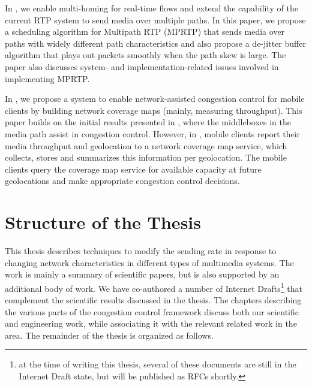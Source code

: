 In , we enable multi-homing for real-time flows and extend the
capability of the current RTP system to send media over multiple paths. In
this paper, we propose a scheduling algorithm for Multipath RTP (MPRTP) that
sends media over paths with widely different path characteristics and also
propose a de-jitter buffer algorithm that plays out packets smoothly when the
path skew is large. The paper also discusses system- and implementation-related
issues involved in implementing MPRTP.

In , we propose a system to enable network-assisted
congestion control for mobile clients by building network coverage maps
(mainly, measuring throughput). This paper builds on the initial results
presented in , where the middleboxes in the media path assist
in congestion control. However, in , mobile clients report
their media throughput and geolocation to a network coverage map service, which
collects, stores and summarizes this information per geolocation. The mobile
clients query the coverage map service for available capacity at future
geolocations and make appropriate congestion control decisions.

\section{Structure of the Thesis}

This thesis describes techniques to modify the sending rate in response to changing
network characteristics in different types of multimedia systems. The work is
mainly a summary of scientific papers, but is also supported by an additional
body of work. We have co-authored a number of Internet Drafts\footnote{at the
time of writing this thesis, several of these documents are still in the
Internet Draft state, but will be published as RFCs shortly.} that complement
the scientific results discussed in the thesis. The chapters describing the
various parts of the congestion control framework discuss both our scientific
and engineering work, while associating it with the relevant related work in
the area. The remainder of the thesis is organized as follows.


